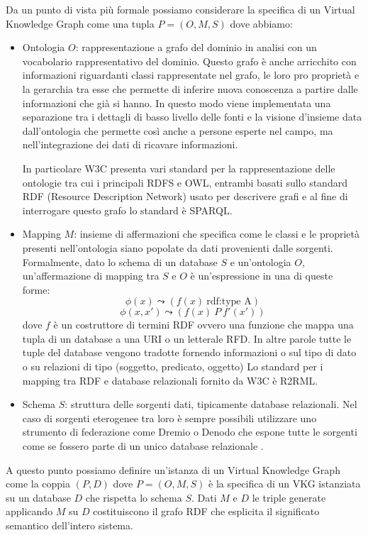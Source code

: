 Da un punto di vista più formale possiamo considerare la specifica di un Virtual Knowledge Graph come una tupla $P = (O, M, S)$ dove abbiamo:
\begin{itemize}
    \item Ontologia $O$: rappresentazione a grafo del dominio in analisi con un vocabolario rappresentativo del dominio. Questo grafo è anche arricchito con informazioni riguardanti classi rappresentate nel grafo, le loro pro
        proprietà e la gerarchia tra esse che permette di inferire nuova conoscenza a partire dalle informazioni che già si hanno.
        In questo modo viene implementata una separazione tra i dettagli di basso livello delle fonti e la visione d'insieme data dall'ontologia che permette così anche a persone esperte nel campo, ma nell'integrazione 
        dei dati di ricavare informazioni. 
        
        In particolare W3C presenta vari standard per la rappresentazione delle ontologie tra cui i principali RDFS e OWL, entrambi basati sullo standard RDF (Resource Description Network) usato per descrivere grafi e al 
        fine di interrogare questo grafo lo standard è SPARQL.
    \item Mapping $M$: insieme di affermazioni che specifica come le classi e le proprietà presenti nell'ontologia siano popolate da dati provenienti dalle sorgenti. Formalmente, dato lo schema di un database $S$ e 
        un'ontologia $O$, un'affermazione di mapping tra $S$ e $O$ è un'espressione in una di queste forme:
        \[ \phi(x) \leadsto (f(x) \ \textrm{rdf:type A}) \]
        \[\phi(x, x') \leadsto (f(x) \ P \ f'(x'))\] 
        dove $f$ è un costruttore di termini RDF ovvero una funzione che mappa una tupla di un database a una URI o un letterale RFD.
        In altre parole tutte le tuple del database vengono tradotte fornendo informazioni o sul tipo di dato o su relazioni di tipo (soggetto, predicato, oggetto)
        Lo standard per i mapping tra RDF e database relazionali fornito da W3C è R2RML.
    \item Schema $S$: struttura delle sorgenti dati, tipicamente database relazionali. Nel caso di sorgenti eterogenee tra loro è sempre possibili utilizzare uno strumento di federazione come Dremio o Denodo che espone tutte
        le sorgenti come se fossero parte di un unico database relazionale \cite{VKGMedical}.
\end{itemize}

A questo punto possiamo definire un'istanza di un Virtual Knowledge Graph come la coppia $(P, D)$ dove $P = (O, M, S)$ è la specifica di un VKG istanziata su un database $D$ che rispetta lo schema $S$.
Dati $M$ e $D$ le triple generate applicando $M$ su $D$ costituiscono il grafo RDF che esplicita il significato semantico dell'intero sistema.

